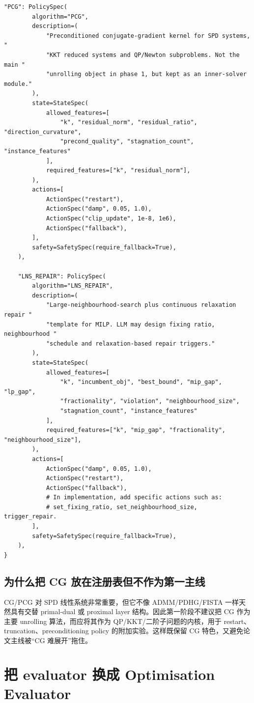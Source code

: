 \documentclass[12pt,a4paper]{ctexart}
\begin{document}
\begin{lstlisting}[style=pythonstyle]
    "PCG": PolicySpec(
        algorithm="PCG",
        description=(
            "Preconditioned conjugate-gradient kernel for SPD systems, "
            "KKT reduced systems and QP/Newton subproblems. Not the main "
            "unrolling object in phase 1, but kept as an inner-solver module."
        ),
        state=StateSpec(
            allowed_features=[
                "k", "residual_norm", "residual_ratio", "direction_curvature",
                "precond_quality", "stagnation_count", "instance_features"
            ],
            required_features=["k", "residual_norm"],
        ),
        actions=[
            ActionSpec("restart"),
            ActionSpec("damp", 0.05, 1.0),
            ActionSpec("clip_update", 1e-8, 1e6),
            ActionSpec("fallback"),
        ],
        safety=SafetySpec(require_fallback=True),
    ),

    "LNS_REPAIR": PolicySpec(
        algorithm="LNS_REPAIR",
        description=(
            "Large-neighbourhood-search plus continuous relaxation repair "
            "template for MILP. LLM may design fixing ratio, neighbourhood "
            "schedule and relaxation-based repair triggers."
        ),
        state=StateSpec(
            allowed_features=[
                "k", "incumbent_obj", "best_bound", "mip_gap", "lp_gap",
                "fractionality", "violation", "neighbourhood_size",
                "stagnation_count", "instance_features"
            ],
            required_features=["k", "mip_gap", "fractionality", "neighbourhood_size"],
        ),
        actions=[
            ActionSpec("damp", 0.05, 1.0),
            ActionSpec("restart"),
            ActionSpec("fallback"),
            # In implementation, add specific actions such as:
            # set_fixing_ratio, set_neighbourhood_size, trigger_repair.
        ],
        safety=SafetySpec(require_fallback=True),
    ),
}
\end{lstlisting}

\subsection{为什么把 CG 放在注册表但不作为第一主线}
CG/PCG 对 SPD 线性系统非常重要，但它不像 ADMM/PDHG/FISTA 一样天然具有交替 primal-dual 或 proximal layer 结构。因此第一阶段不建议把 CG 作为主要 unrolling 算法，而应将其作为 QP/KKT/二阶子问题的内核，用于 restart、truncation、preconditioning policy 的附加实验。这样既保留 CG 特色，又避免论文主线被“CG 难展开”拖住。

\section{把 evaluator 换成 Optimisation Evaluator}
\end{document}
